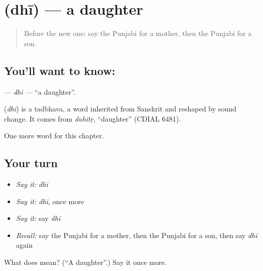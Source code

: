 \section[\texorpdfstring{\pa{ਧੀ} (dhī)}{ਧੀ (dhī)}]{ (dhī) — a daughter}

\label{lesson:PA-C53-dhi}



\begin{quote}
Before the new one: say the Punjabi for a mother, then the Punjabi for a son.
\end{quote}

\subsection*{You'll want to know: }
\textbf{} — \emph{dhī} — \textquotedblleft{}a daughter\textquotedblright{}.

\begin{cousinweb}
\textbf{} (\emph{dhī}) is a tadbhava, a word inherited from Sanskrit and reshaped by sound change. It comes from \emph{duhitṛ}, \textquotedblleft{}daughter\textquotedblright{} (CDIAL 6481).
\end{cousinweb}

\begin{grammarlens}[title={What you've built}]
One more word for this chapter.
\end{grammarlens}

\subsection*{Your turn}
\begin{itemize}
\raggedright
  \item \emph{Say it:} \emph{dhī}
  \item \emph{Say it:} \emph{dhī}, once more
  \item \emph{Say it:} say \emph{dhī}
  \item \emph{Recall:} say the Punjabi for a mother, then the Punjabi for a son, then say \emph{dhī} again
\end{itemize}

\begin{tcolorbox}[breakable,colback=teal!4,colframe=teal!35!black,title={Before you move on}]
What does  mean? (\textquotedblleft{}A daughter\textquotedblright{}.) Say it once more.
\end{tcolorbox}

